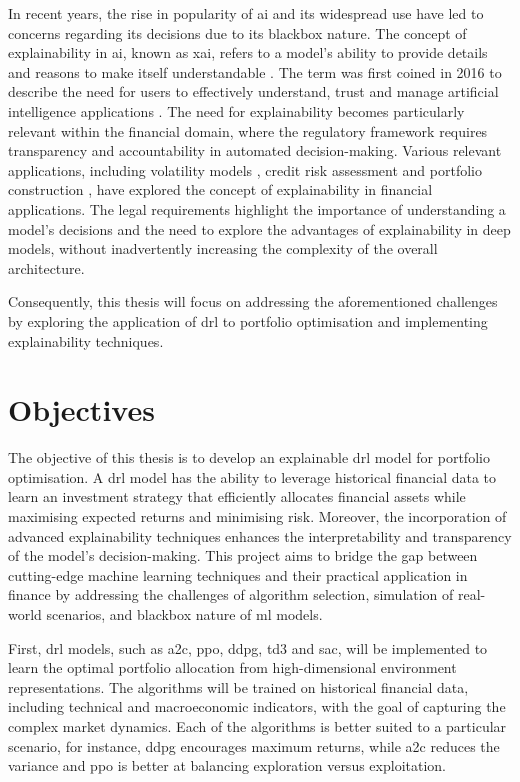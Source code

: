 In recent years, the rise in popularity of \acrfull{ai} and its widespread use have led to concerns regarding its decisions due to its \gls{blackbox} nature. The concept of explainability in \acrshort{ai}, known as \acrfull{xai}, refers to a model's ability to provide details and reasons to make itself understandable \cite{BarredoArrieta2019}. The term was first coined in 2016 to describe the need for users to effectively understand, trust and manage artificial intelligence applications \cite{Gunning2019}. The need for explainability becomes particularly relevant within the financial domain, where the regulatory framework requires transparency and accountability in automated decision-making. Various relevant applications, including volatility models \cite{Brigo2021}, credit risk assessment \cite{GarciaCespedes2025} and portfolio construction \cite{Cortes2024}, have explored the concept of explainability in financial applications. The legal requirements highlight the importance of understanding a model's decisions and the need to explore the advantages of explainability in deep models, without inadvertently increasing the complexity of the overall architecture.

Consequently, this thesis will focus on addressing the aforementioned challenges by exploring the application of \acrfull{drl} to portfolio optimisation and implementing explainability techniques.

\section{Objectives} \label{sec:introduction-objectives}

The objective of this thesis is to develop an explainable \acrlong{drl} model for portfolio optimisation. A \acrshort{drl} model has the ability to leverage historical financial data to learn an investment strategy that efficiently allocates financial assets while maximising expected returns and minimising risk. Moreover, the incorporation of advanced explainability techniques enhances the interpretability and transparency of the model's decision-making. This project aims to bridge the gap between cutting-edge machine learning techniques and their practical application in finance by addressing the challenges of algorithm selection, simulation of real-world scenarios, and \gls{blackbox} nature of \acrshort{ml} models.

First, \acrshort{drl} models, such as \acrfull{a2c}, \acrfull{ppo}, \acrfull{ddpg}, \acrfull{td3} and \acrfull{sac}, will be implemented to learn the optimal portfolio allocation from high-dimensional environment representations. The algorithms will be trained on historical financial data, including technical and macroeconomic indicators, with the goal of capturing the complex market dynamics. Each of the algorithms is better suited to a particular scenario, for instance, \acrshort{ddpg} encourages maximum returns, while \acrshort{a2c} reduces the variance and \acrshort{ppo} is better at balancing \gls{exploration} versus \gls{exploitation}.

